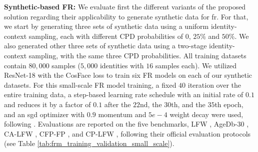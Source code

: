 \documentclass[10pt,twocolumn,letterpaper]{article}
\begin{document}
\textbf{Synthetic-based FR:}
We evaluate first the different variants of the proposed solution regarding their applicability to generate synthetic data for \acrshort{fr}. For that, we start by generating three sets of synthetic data using a uniform identity-context sampling, each with different CPD probabilities of $0$, $25\%$ and $50\%$. We also generated other three sets of synthetic data using a two-stage identity-context sampling, with the same three CPD probabilities. All training datasets contain $80{,}000$ samples ($5{,}000$ identities with $16$ samples each). We utilized ResNet-18 \cite{ResNet} with the CosFace \cite{CosFace} loss to train six FR models on each of our synthetic datasets.
For this small-scale FR model training, a fixed $40$ iteration over the entire training data, a step-based learning rate schedule with an initial rate of $0.1$ and reduces it by a factor of $0.1$ after the $22$nd, the $30$th, and the $35$th epoch, and an \acrshort{sgd} optimizer with $0.9$ momentum and $5e-4$ weight decay were used, following \cite{FBoutros2022USynthFace}. Evaluations are reported on the five benchmarks, LFW \cite{LFWDatabase}, AgeDb-30 \cite{AgeDB30Database}, CA-LFW \cite{CALFWDatabase}, CFP-FP \cite{CFPFPDatabase}, and CP-LFW \cite{CPLFWDatabase}, following their official evaluation protocols (see Table \ref{tab:frm_training_validation_small_scale}).
\end{document}
